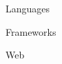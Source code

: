 

\cventrytech
    {Languages}
    {
        \diRustPlain
        \diPythonPlainWordmark
        \diJavascriptPlain
        \diCplusplusPlainWordmark
        \diJavaPlainWordmark
        \diRubyPlainWordmark
        \diTypescriptPlain
        \diGroovyPlain
    }

\cventrytech
    {Frameworks}
    {
        
        \diDockerPlainWordmark
        \diTerraformPlainWordmark
        \diKubernetesPlainWordmark
        \diNumpyOriginalWordmark
        \diAnacondaOriginalWordmark
    }

\cventrytech
    {Web}
    {
        \diVuejsPlainWordmark
        \diReactPlainWordmark
        \diApachePlainWordmark
        \diMysqlPlainWordmark
        \diWordpressPlainWordmark
    }

